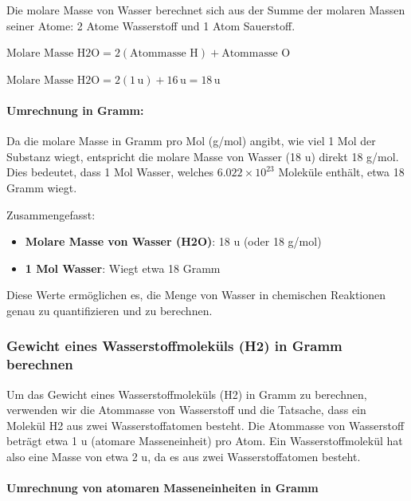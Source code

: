 \documentclass{vorlage-design-main}
\begin{document}
Die molare Masse von Wasser berechnet sich aus der Summe der molaren
Massen seiner Atome: 2 Atome Wasserstoff und 1 Atom Sauerstoff.

$\text{Molare Masse H2O} = 2(\text{Atommasse H}) + \text{Atommasse O}$

$\text{Molare Masse H2O} = 2(1 \, \text{u}) + 16 \, \text{u} = 18 \, \text{u}$

\hypertarget{umrechnung-in-gramm}{%
\paragraph{Umrechnung in Gramm:}\label{umrechnung-in-gramm}}

Da die molare Masse in Gramm pro Mol (g/mol) angibt, wie viel 1 Mol der
Substanz wiegt, entspricht die molare Masse von Wasser (18 u) direkt 18
g/mol. Dies bedeutet, dass 1 Mol Wasser, welches
$6.022 \times 10^{23}$ Moleküle enthält, etwa 18 Gramm wiegt.

Zusammengefasst:

\begin{itemize}

\item
  \textbf{Molare Masse von Wasser (H2O)}: 18 u (oder 18 g/mol)
\item
  \textbf{1 Mol Wasser}: Wiegt etwa 18 Gramm
\end{itemize}

Diese Werte ermöglichen es, die Menge von Wasser in chemischen
Reaktionen genau zu quantifizieren und zu berechnen.

\hypertarget{gewicht-eines-wasserstoffmolekuxfcls-h2-in-gramm-berechnen}{%
\subsubsection{Gewicht eines Wasserstoffmoleküls (H2) in Gramm
berechnen}\label{gewicht-eines-wasserstoffmolekuels-h2-in-gramm-berechnen}}

Um das Gewicht eines Wasserstoffmoleküls (H2) in Gramm zu berechnen,
verwenden wir die Atommasse von Wasserstoff und die Tatsache, dass ein
Molekül H2 aus zwei Wasserstoffatomen besteht. Die Atommasse von
Wasserstoff beträgt etwa 1 u (atomare Masseneinheit) pro Atom. Ein
Wasserstoffmolekül hat also eine Masse von etwa 2 u, da es aus zwei
Wasserstoffatomen besteht.

\hypertarget{umrechnung-von-atomaren-masseneinheiten-in-gramm}{%
\paragraph{Umrechnung von atomaren Masseneinheiten in
Gramm}\label{umrechnung-von-atomaren-masseneinheiten-in-gramm}}
\end{document}
